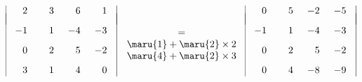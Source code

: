 \documentclass[a4paper,10pt,onecolumn,oneside,notitlepage,final]{jsarticle} %
\begin{document}
$\begin{array}{|rrrr@{\quad}|}
\hspace{6mm}&\hspace{6mm}&\hspace{6mm}&\hspace{6mm}\\[-7mm]
   2&   3&   6&   1\\[3mm]
  -1&   1&  -4&  -3\\[3mm]
   0&   2&   5&  -2\\[3mm]
   3&   1&   4&   0\\
\end{array}$
$\begin{array}{ll}
\hfill = \hfill\\
\maru{1}+\maru{2}\times 2\\
\maru{4}+\maru{2}\times 3\\
\end{array}$
$\begin{array}{|rrrr@{\quad}|}
\hspace{6mm}&\hspace{6mm}&\hspace{6mm}&\hspace{6mm}\\[-7mm]
   0&   5&  -2&  -5\\[3mm]
  -1&   1&  -4&  -3\\[3mm]
   0&   2&   5&  -2\\[3mm]
   0&   4&  -8&  -9\\
\end{array}$
\end{document}
